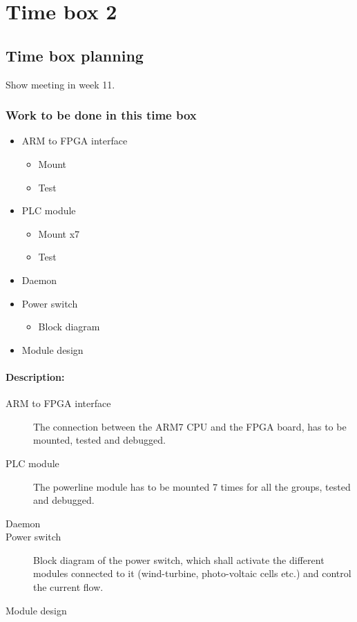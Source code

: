 \section{Time box 2}
\subsection{Time box planning}
Show meeting in week 11.
\subsubsection{Work to be done in this time box}
\begin{itemize}
	\item ARM to FPGA interface
	\begin{itemize}
		\item Mount
		\item Test
	\end{itemize}
	\item PLC module
	\begin{itemize}
		\item Mount x7
		\item Test
	\end{itemize}
	\item Daemon
	\item Power switch
	\begin{itemize}
		\item Block diagram
	\end{itemize}
	\item Module design
\end{itemize}
\paragraph{Description:}
\begin{description}
	\item[ARM to FPGA interface] The connection between the ARM7 CPU and the FPGA board, has to be mounted, tested and debugged.
	\item[PLC module] The powerline module has to be mounted 7 times for all the groups, tested and debugged.
	\item[Daemon] 
	\item[Power switch] Block diagram of the power switch, which shall activate the different modules connected to it (wind-turbine, photo-voltaic cells etc.) and control the current flow.
	\item[Module design]
\end{description}

